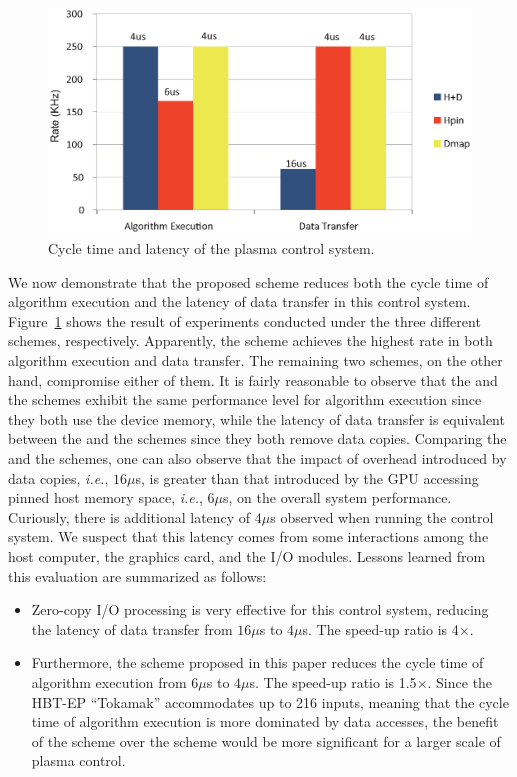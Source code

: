\begin{figure}[t]
 \centering
 \includegraphics[width=\hsize]{eps/eval_plasma.eps}
 \caption{Cycle time and latency of the plasma control system.}
 \label{fig:eval_plasma}
\end{figure}

We now demonstrate that the proposed {\dm} scheme reduces both
the cycle time of algorithm execution and the latency of data transfer
in this control system.
Figure~\ref{fig:eval_plasma} shows the result of experiments conducted
under the three different schemes, respectively.
Apparently, the {\dm} scheme achieves the highest rate in both algorithm
execution and data transfer.
The remaining two schemes, on the other hand, compromise either of them.
It is fairly reasonable to observe that the {\hd} and the {\dm} schemes
exhibit the same performance level for algorithm execution since they
both use the device memory, while the latency of data transfer is
equivalent between the {\hp} and the {\dm} schemes since they both
remove data copies.
Comparing the {\hd} and the {\hp} schemes, one can also observe that the
impact of overhead introduced by data copies, \textit{i.e.}, $16\mu$s, is
greater than that introduced by the GPU accessing pinned host memory
space, \textit{i.e.}, $6\mu$s, on the overall system performance.
Curiously, there is additional latency of $4\mu$s observed when running
the control system.
We suspect that this latency comes from some interactions among the host
computer, the graphics card, and the I/O modules.
Lessons learned from this evaluation are summarized as follows:
\begin{itemize}
 \item Zero-copy I/O processing is very effective for this control
       system, reducing the latency of data transfer from $16\mu$s to
       $4\mu$s.
       The speed-up ratio is 4$\times$.
 \item Furthermore, the {\dm} scheme proposed in this paper reduces the
       cycle time of algorithm execution from $6\mu$s to $4\mu$s.
       The speed-up ratio is 1.5$\times$.
       Since the HBT-EP ``Tokamak'' accommodates up to 216 inputs,
       meaning that the cycle time of algorithm execution is more
       dominated by data accesses, the benefit of the {\dm} scheme over
       the {\hp} scheme would be more significant for a larger scale of
       plasma control.
\end{itemize}


